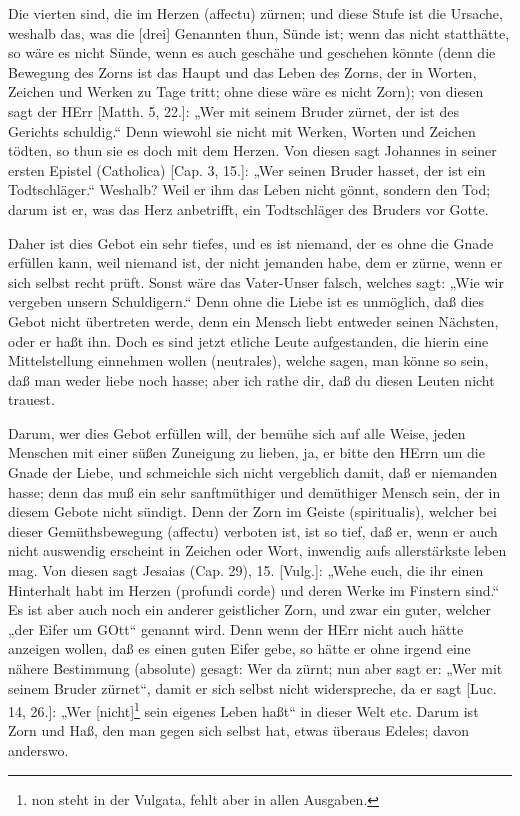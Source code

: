 Die vierten sind, die im Herzen (affectu) zürnen; und diese Stufe ist die Ursache, weshalb das, was die [drei] Genannten thun, Sünde ist; wenn das nicht statthätte, so wäre es nicht Sünde, wenn es auch geschähe und geschehen könnte (denn die Bewegung des Zorns ist das Haupt und das Leben des Zorns, der in Worten, Zeichen und Werken zu Tage tritt; ohne diese wäre es nicht Zorn); von diesen sagt der HErr [Matth. 5, 22.]: „Wer mit seinem Bruder zürnet, der ist des Gerichts schuldig.“ Denn wiewohl sie nicht mit Werken, Worten und Zeichen tödten, so thun sie es doch mit dem Herzen. Von diesen sagt Johannes in seiner ersten Epistel (Catholica) [Cap. 3, 15.]: „Wer seinen Bruder hasset, der ist ein Todtschläger.“ Weshalb? Weil er ihm das Leben nicht gönnt, sondern den Tod; darum ist er, was das Herz anbetrifft, ein Todtschläger des Bruders vor Gotte.

Daher ist dies Gebot ein sehr tiefes, und es ist niemand, der es ohne die Gnade erfüllen kann, weil niemand ist, der nicht jemanden habe, dem er zürne, wenn er sich selbst recht prüft. Sonst wäre das Vater-Unser falsch, welches sagt: „Wie wir vergeben unsern Schuldigern.“ Denn ohne die Liebe ist es unmöglich, daß dies Gebot nicht übertreten werde, denn ein Mensch liebt entweder seinen Nächsten, oder er haßt ihn. Doch es sind jetzt etliche Leute aufgestanden, die hierin eine Mittelstellung einnehmen wollen (neutrales), welche sagen, man könne so sein, daß man weder liebe noch hasse; aber ich rathe dir, daß du diesen Leuten nicht trauest.

Darum, wer dies Gebot erfüllen will, der bemühe sich auf alle Weise, jeden Menschen mit einer süßen Zuneigung zu lieben, ja, er bitte den HErrn um die Gnade der Liebe, und schmeichle sich nicht vergeblich damit, daß er niemanden hasse; denn das muß ein sehr sanftmüthiger und demüthiger Mensch sein, der in diesem Gebote nicht sündigt. Denn der Zorn im Geiste (spiritualis), welcher bei dieser Gemüthsbewegung (affectu) verboten ist, ist so tief, daß er, wenn er auch nicht auswendig erscheint in Zeichen oder Wort, inwendig aufs allerstärkste leben mag. Von diesen sagt Jesaias (Cap. 29), 15. [Vulg.]: „Wehe euch, die ihr einen Hinterhalt habt im Herzen (profundi corde) und deren Werke im Finstern sind.“ Es ist aber auch noch ein anderer geistlicher
Zorn, und zwar ein guter, welcher „der Eifer um GOtt“ genannt wird. Denn wenn der HErr nicht auch hätte anzeigen wollen, daß es einen guten Eifer gebe, so hätte er ohne irgend eine nähere Bestimmung (absolute) gesagt: Wer da zürnt; nun aber sagt er: „Wer mit seinem Bruder zürnet“, damit er sich selbst nicht widerspreche, da er sagt [Luc. 14, 26.]: „Wer [nicht]\footnote{non steht in der Vulgata, fehlt aber in allen Ausgaben.} sein eigenes Leben haßt“ in dieser Welt etc. Darum ist Zorn und Haß, den man gegen sich selbst hat, etwas überaus Edeles; davon anderswo.

